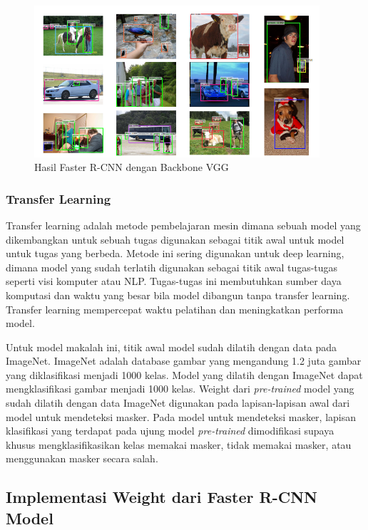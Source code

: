 \documentclass{article}
\begin{document}
   	\begin{figure}[H]
   		\centering
   		\includegraphics[width=400px]{arsitektur/contoh_hasil.png}
   		\caption{Hasil Faster R-CNN dengan Backbone VGG}
   	\end{figure}
   	
   	\subsubsection{Transfer Learning}
   	\par Transfer learning adalah metode pembelajaran mesin dimana sebuah model yang dikembangkan untuk sebuah tugas digunakan sebagai titik awal untuk model untuk tugas yang berbeda. Metode ini sering digunakan untuk deep learning, dimana model yang sudah terlatih digunakan sebagai titik awal tugas-tugas seperti visi komputer atau NLP. Tugas-tugas ini membutuhkan sumber daya komputasi dan waktu yang besar bila model dibangun tanpa transfer learning. Transfer learning mempercepat waktu pelatihan dan meningkatkan performa model.
   	
   	\par Untuk model makalah ini, titik awal model sudah dilatih dengan data pada ImageNet. ImageNet adalah database gambar yang mengandung 1.2 juta gambar yang diklasifikasi menjadi 1000 kelas. Model yang dilatih dengan ImageNet dapat mengklasifikasi gambar menjadi 1000 kelas. Weight dari \textit{pre-trained} model yang sudah dilatih dengan data ImageNet digunakan pada lapisan-lapisan awal dari model untuk mendeteksi masker. Pada model untuk mendeteksi masker, lapisan klasifikasi yang terdapat pada ujung model \textit{pre-trained} dimodifikasi supaya khusus mengklasifikasikan kelas memakai masker, tidak memakai masker, atau menggunakan masker secara salah.  
   	
   	\newpage
  	\subsection{Implementasi Weight dari Faster R-CNN Model}
\end{document}
